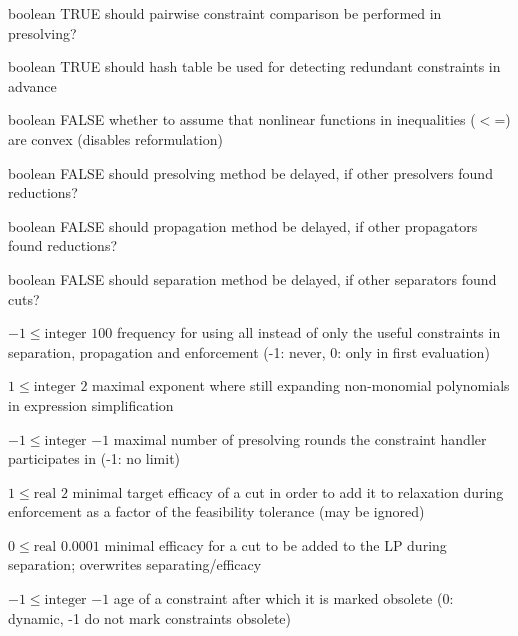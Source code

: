 %
{boolean}%
{TRUE}%
{should pairwise constraint comparison be performed in presolving?}%
{}

%
{boolean}%
{TRUE}%
{should hash table be used for detecting redundant constraints in advance}%
{}

%
{boolean}%
{FALSE}%
{whether to assume that nonlinear functions in inequalities ($<$=) are convex (disables reformulation)}%
{}

%
{boolean}%
{FALSE}%
{should presolving method be delayed, if other presolvers found reductions?}%
{}

%
{boolean}%
{FALSE}%
{should propagation method be delayed, if other propagators found reductions?}%
{}

%
{boolean}%
{FALSE}%
{should separation method be delayed, if other separators found cuts?}%
{}

%
{$-1\leq\textrm{integer}$}%
{$100$}%
{frequency for using all instead of only the useful constraints in separation, propagation and enforcement (-1: never, 0: only in first evaluation)}%
{}

%
{$1\leq\textrm{integer}$}%
{$2$}%
{maximal exponent where still expanding non-monomial polynomials in expression simplification}%
{}

%
{$-1\leq\textrm{integer}$}%
{$-1$}%
{maximal number of presolving rounds the constraint handler participates in (-1: no limit)}%
{}

%
{$1\leq\textrm{real}$}%
{$2$}%
{minimal target efficacy of a cut in order to add it to relaxation during enforcement as a factor of the feasibility tolerance (may be ignored)}%
{}

%
{$0\leq\textrm{real}$}%
{$0.0001$}%
{minimal efficacy for a cut to be added to the LP during separation; overwrites separating/efficacy}%
{}

%
{$-1\leq\textrm{integer}$}%
{$-1$}%
{age of a constraint after which it is marked obsolete (0: dynamic, -1 do not mark constraints obsolete)}%
{}

